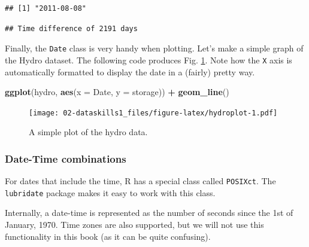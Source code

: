 \documentclass[]{book}
\newenvironment{Shaded}{\begin{snugshade}}{\end{snugshade}}
\newcommand{\CommentTok}[1]{\textcolor[rgb]{0.56,0.35,0.01}{\textit{#1}}}
\newcommand{\DataTypeTok}[1]{\textcolor[rgb]{0.13,0.29,0.53}{#1}}
\newcommand{\KeywordTok}[1]{\textcolor[rgb]{0.13,0.29,0.53}{\textbf{#1}}}
\newcommand{\NormalTok}[1]{#1}
\newcommand{\OperatorTok}[1]{\textcolor[rgb]{0.81,0.36,0.00}{\textbf{#1}}}
\newcommand{\StringTok}[1]{\textcolor[rgb]{0.31,0.60,0.02}{#1}}
\begin{document}
\begin{verbatim}
## [1] "2011-08-08"
\end{verbatim}

\begin{Shaded}
\end{Shaded}

\begin{verbatim}
## Time difference of 2191 days
\end{verbatim}

Finally, the \texttt{Date} class is very handy when plotting. Let's make a simple graph of the Hydro dataset. The following code produces Fig. \ref{fig:hydroplot}. Note how the \texttt{X} axis is automatically formatted to display the date in a (fairly) pretty way.

\begin{Shaded}
\begin{Highlighting}[]
\KeywordTok{ggplot}\NormalTok{(hydro, }\KeywordTok{aes}\NormalTok{(}\DataTypeTok{x =}\NormalTok{ Date, }\DataTypeTok{y =}\NormalTok{ storage)) }\OperatorTok{+}
\StringTok{  }\KeywordTok{geom_line}\NormalTok{()}
\end{Highlighting}
\end{Shaded}

\begin{figure}
\centering
\texttt{[image: 02-dataskills1\_files/figure-latex/hydroplot-1.pdf]}
\caption{\label{fig:hydroplot}A simple plot of the hydro data.}
\end{figure}

\hypertarget{datetime}{%
\subsubsection{Date-Time combinations}\label{datetime}}

For dates that include the time, R has a special class called \texttt{POSIXct}. The \texttt{lubridate} package makes it easy to work with this class.

Internally, a date-time is represented as the number of seconds since the 1st of January, 1970. Time zones are also supported, but we will not use this functionality in this book (as it can be quite confusing).
\end{document}
